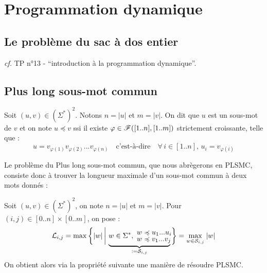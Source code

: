 \section{Programmation dynamique}

	\subsection{Le problème du sac à dos entier}
		
		\emph{cf.} TP n°13 - ``introduction à la programmation dynamique''.
		
	\subsection{Plus long sous-mot commun}
	
		
		\eqskip{2mm}
		\begin{Rappel}
			Soit \( (u, v) \in (\Sigma^*)^2 \). Notons \( n = |u| \) et \( m = |v| \). On dit que $u$ est un sous-mot de $v$ et on note \( u \preccurlyeq v \) ssi il existe \( \varphi \in \mathscr{F} ([1..n], [1..m]) \) strictement croissante, telle que :
				\[ u = v_{\varphi(1)} v_{\varphi(2)} ... v_{\varphi(n)} \quad \text{c'est-à-dire} \quad \forall \, i \in [1..n], \, u_i = v_{\varphi(i)} \]
		\end{Rappel}
		
		Le problème du \textsf{Plus long sous-mot commun}, que nous abrègerons en \textsf{PLSMC}, consiste donc à trouver la longueur maximale d'un sous-mot commun à deux mots donnés :
		\begin{center}
		\end{center}
		
		\eqskip{2mm}
		Soit \( (u, v) \in (\Sigma^*)^2 \), on note \( n = |u| \) et \( m = |v| \).
		Pour \( (i,j) \in [0..n] \times [0..m] \), on pose :
				\[
					\cal{L}_{i,j} = \max \bigg\{ |w| \, \bigg| \, \underbrace{w \in \Sigma^*, \hspace*{-1mm}
						\begin{tabular}{l}
							$w \preccurlyeq u_1 ... u_i$ \hspace{-4mm} \\[-1mm]
							$w \preccurlyeq v_1 ... v_j$ \hspace{-4mm}
						\end{tabular}}_{:= \cal{S}_{i,j}}
					\bigg\}
					= \underset{w \in \cal{S}_{i,j}}{\max} \: |w|
				\]
			On obtient alors via la propriété suivante une manière de résoudre \textsf{PLSMC}.
		

